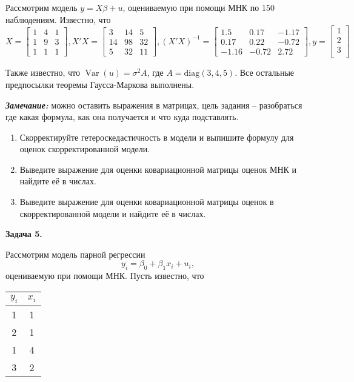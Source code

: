 \documentclass[10pt, a4paper]{extarticle}
\DeclareMathOperator{\Var}{Var}
\begin{document}
	Рассмотрим модель $y = X\beta + u$, оцениваемую при помощи МНК по 150 наблюдениям. Известно, что
	\[
	X = \begin{bmatrix}
	1 & 4 & 1 \\
	1 & 9 & 3 \\
	1 & 1 & 1
	\end{bmatrix},
	X'X = \begin{bmatrix}
		3 & 14 & 5 \\
		14 & 98 & 32 \\
		5 & 32 & 11
	\end{bmatrix},
	(X'X)^{-1} = \begin{bmatrix}
		1.5 & 0.17 & -1.17 \\
		0.17 & 0.22 & -0.72 \\
		-1.16 & -0.72 & 2.72
	\end{bmatrix},
	y = \begin{bmatrix}
		1 \\
		2 \\
		3 \\
	\end{bmatrix}
	\]
	
	Также известно, что $\Var(u) = \sigma^2A$, где $A = \mathrm{diag}(3, 4, 5)$. Все остальные предпосылки теоремы Гаусса-Маркова выполнены.
	
	\textit{\textbf{Замечание:}} можно оставить выражения в матрицах, цель задания -- разобраться где какая формула, как она получается и что куда подставлять.
	
	\begin{enumerate}[label = \alph*)]
		\item Скорректируйте гетероскедастичность в модели и выпишите формулу для оценок скорректированной модели.
		\item Выведите выражение для оценки ковариационной матрицы оценок МНК и найдите её в числах.
		\item Выведите выражение для оценки ковариационной матрицы оценок в скорректированной модели и найдите её в числах.
	\end{enumerate}
	\vspace{1em}

	{\Large \textbf{Задача 5.}}
	
	Рассмотрим модель парной регрессии
	\[
	y_i = \beta_0 + \beta_1x_i + u_i,
	\]
	оцениваемую при помощи МНК. Пусть известно, что 
	
	\begin{center}
	\begin{tabular}{c|c}
		$y_i$ & $x_i$ \\
		\hline
		1 & 1 \\
		2 & 1 \\
		1 & 4 \\
		3 & 2
	\end{tabular}
	\end{center}
\end{document}
